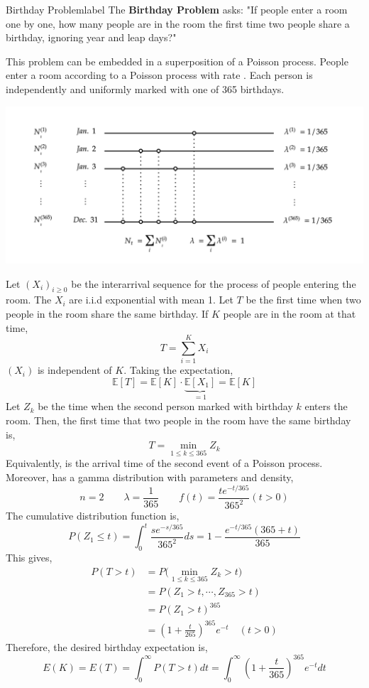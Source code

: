\documentclass{tufte-handout}
\begin{document}
\begin{ex}{Birthday Problem}{label}
  The \textbf{Birthday Problem} asks: "If people enter a room one by one, how many people are in the room the first time two people share a birthday, ignoring year and leap days?"

  \vphantom{.}

  This problem can be embedded in a superposition of a Poisson process. People enter a room according to a Poisson process  with rate . Each person is independently and uniformly marked with one of 365 birthdays.
  \begin{center}
    \includegraphics[width=\textwidth]{fig-21.png}
  \end{center}
  Let $(X_i)_{i \geq 0}$ be the interarrival sequence for the process of people entering the room. The $X_i$ are i.i.d exponential with mean 1. Let $T$ be the first time when two people in the room share the same birthday. If $K$ people are in the room at that time,
  \[T=\sum_{i=1}^{K} X_{i}\]
  \noindent $(X_i)$ is independent of $K$. Taking the expectation,
  \[\mathbb{E}[T] = \mathbb{E}[K] \cdot \underbrace{\mathbb{E}[X_1]}_{= 1} = \mathbb{E}[K]\]
  \noindent Let $Z_k$ be the time when the second person marked with birthday $k$ enters the room. Then, the first time that two people in the room have the same birthday is,
  \[T = \min_{1 \leq k \leq 365} Z_k\]
  \noindent Equivalently,  is the arrival time of the second event of a Poisson process. Moreover,  has a gamma distribution with parameters and density,
  \[n = 2 \quad \quad \lambda = \frac{1}{365} \quad \quad f(t)=\frac{t e^{-t / 365}}{365^{2}} (t>0)\]
  \noindent The cumulative distribution function is,
  \[P\left(Z_{1} \leq t\right)=\int_{0}^{t} \frac{s e^{-s / 365}}{365^{2}} d s=1-\frac{e^{-t / 365}(365+t)}{365}\]
  \noindent This gives,
  \begin{align*}
    P(T > t) &= P\bigg(\min_{1 \leq k \leq 365} Z_k > t\bigg) \\
             &= P(Z_1 > t, \cdots, Z_{365} > t) \\
             &= P\left(Z_{1}>t\right)^{365} \\
             &= \left(1+\frac{t}{265}\right)^{365} e^{-t} \quad (t > 0)
  \end{align*}
  \noindent Therefore, the desired birthday expectation is,
  \[E(K)=E(T)=\int_{0}^{\infty} P(T>t) d t=\int_{0}^{\infty}\left(1+\frac{t}{365}\right)^{365} e^{-t} d t\]
\end{ex}
\end{document}
